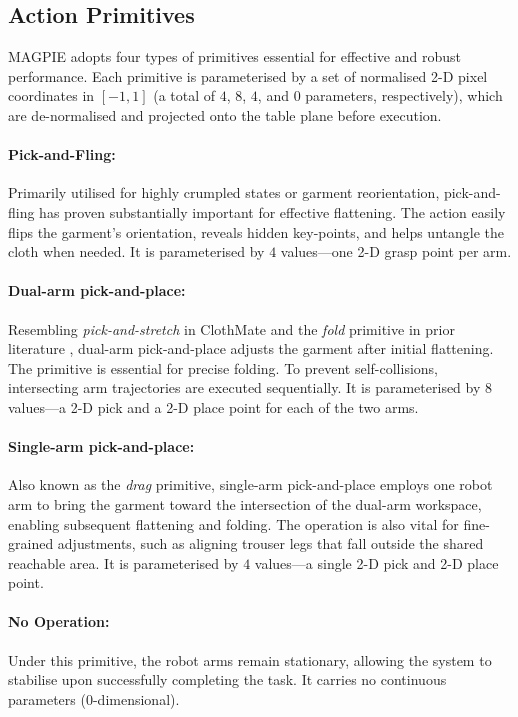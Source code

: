 \documentclass[journal]{IEEEtran}
\begin{document}
\subsection{Action Primitives} \label{sec:action_primitives}

MAGPIE adopts four types of primitives essential for effective and robust performance. Each primitive is parameterised by a set of normalised 2-D pixel coordinates in $[-1, 1]$ (a total of $4$, $8$, $4$, and $0$ parameters, respectively), which are de-normalised and projected onto the table plane before execution.

\paragraph{Pick-and-Fling:} Primarily utilised for highly crumpled states or garment reorientation, pick-and-fling has proven substantially important for effective flattening. The action easily flips the garment's orientation, reveals hidden key-points, and helps untangle the cloth when needed. It is parameterised by $4$ values---one 2-D grasp point per arm.

\paragraph{Dual-arm pick-and-place:} Resembling \textit{pick-and-stretch} in ClothMate \cite{luo2025clothmate} and the \textit{fold} primitive in prior literature \cite{xue2023unifolding}, dual-arm pick-and-place adjusts the garment after initial flattening. The primitive is essential for precise folding. To prevent self-collisions, intersecting arm trajectories are executed sequentially. It is parameterised by $8$ values---a 2-D pick and a 2-D place point for each of the two arms.

\paragraph{Single-arm pick-and-place:} Also known as the \textit{drag} primitive, single-arm pick-and-place employs one robot arm to bring the garment toward the intersection of the dual-arm workspace, enabling subsequent flattening and folding. The operation is also vital for fine-grained adjustments, such as aligning trouser legs that fall outside the shared reachable area. It is parameterised by $4$ values---a single 2-D pick and 2-D place point.

\paragraph{No Operation:} Under this primitive, the robot arms remain stationary, allowing the system to stabilise upon successfully completing the task. It carries no continuous parameters ($0$-dimensional).
\end{document}
